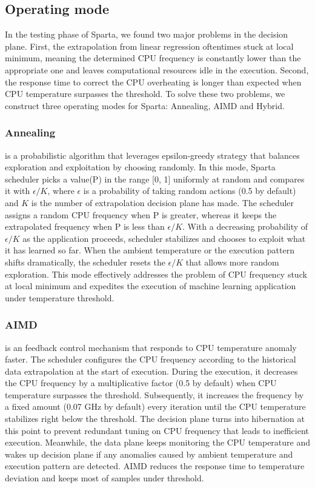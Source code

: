 \subsection{Operating mode}

In the testing phase of Sparta, we found two major problems in the decision plane. First, the extrapolation from linear regression oftentimes stuck at local minimum, meaning the determined CPU frequency is constantly lower than the appropriate one and leaves computational resources idle in the execution. Second, the response time to correct the CPU overheating is longer than expected when CPU temperature surpasses the threshold. To solve these two problems, we construct three operating modes for Sparta: Annealing, AIMD and Hybrid. 

\subsubsection{Annealing} is a probabilistic algorithm that leverages epsilon-greedy strategy that balances exploration and exploitation by choosing randomly. In this mode, Sparta scheduler picks a value(P) in the range [0, 1] uniformly at random and compares it with $\epsilon/K$, where $\epsilon$ is a probability of taking random actions (0.5 by default) and $K$ is the number of extrapolation decision plane has made. The scheduler assigns a random CPU frequency when P is greater, whereas it keeps the extrapolated frequency when P is less than $\epsilon/K$. With a decreasing probability of $\epsilon/K$ as the application proceeds, scheduler stabilizes and chooses to exploit what it has learned so far. When the ambient temperature or the execution pattern shifts dramatically, the scheduler resets the $\epsilon/K$ that allows more random exploration. This mode effectively addresses the problem of CPU frequency stuck at local minimum and expedites the execution of machine learning application under temperature threshold.

\subsubsection{AIMD} is an feedback control mechanism that responds to CPU temperature anomaly faster. The scheduler configures the CPU frequency according to the historical data extrapolation at the start of execution. During the execution, it decreases the CPU frequency by a multiplicative factor (0.5 by default) when CPU temperature surpasses the threshold. Subsequently, it increases the frequency by a fixed amount (0.07 GHz by default) every iteration until the CPU temperature stabilizes right below the threshold. The decision plane turns into hibernation at this point to prevent redundant tuning on CPU frequency that leads to inefficient execution. Meanwhile, the data plane keeps monitoring the CPU temperature and wakes up decision plane if any anomalies caused by ambient temperature and execution pattern are detected. AIMD reduces the response time to temperature deviation and keeps most of samples under threshold. 

